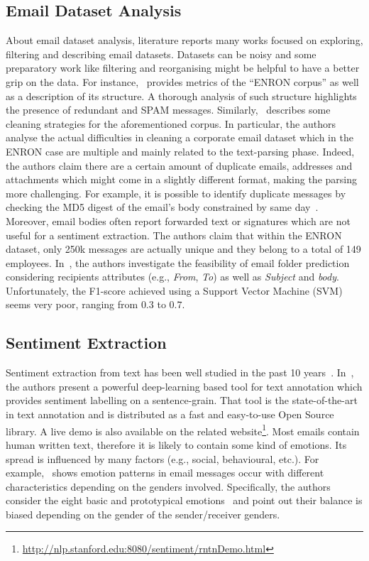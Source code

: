 \documentclass{vldb}
\begin{document}
\subsection{Email Dataset Analysis}
\label{sub-sec:email-dataset-analysis}
About email dataset analysis, literature reports many works focused on exploring, filtering and describing email datasets.
Datasets can be noisy and some preparatory work like filtering and reorganising might be helpful to have a better grip on the data.
For instance,~\cite{klimt2004introducing} provides metrics of the ``ENRON corpus'' as well as a description of its structure.
A thorough analysis of such structure highlights the presence of redundant and SPAM messages.
Similarly,~\cite{zhou2007strategies} describes some cleaning strategies for the aforementioned corpus.
In particular, the authors analyse the actual difficulties in cleaning a corporate email dataset which in the ENRON case are multiple and mainly related to the text-parsing phase.
Indeed, the authors claim there are a certain amount of duplicate emails, addresses and attachments which might come in a slightly different format, making the parsing more challenging.
For example, it is possible to identify duplicate messages by checking the MD5 digest of the email's body constrained by same day~\cite{corrada2004enron}.
Moreover, email bodies often report forwarded text or signatures which are not useful for a sentiment extraction.
The authors claim that within the ENRON dataset, only 250k messages are actually unique and they belong to a total of 149 employees.
In~\cite{klimt2004enron}, the authors investigate the feasibility of email folder prediction considering recipients attributes (e.g., \textit{From}, \textit{To}) as well as \textit{Subject} and \textit{body}.
Unfortunately, the F1-score achieved using a Support Vector Machine (SVM) seems very poor, ranging from $0.3$ to $0.7$. 


\subsection{Sentiment Extraction}
Sentiment extraction from text has been well studied in the past 10 years~\cite{aggarwal2012mining, das2007yahoo, bai2004sentiment, gamon2005pulse, bird2009natural}.
In~\cite{manning2014stanford}, the authors present a powerful deep-learning based tool for text annotation which provides sentiment labelling on a sentence-grain.
That tool is the state-of-the-art in text annotation and is distributed as a fast and easy-to-use Open Source library.
A live demo is also available on the related website\footnote{\url{http://nlp.stanford.edu:8080/sentiment/rntnDemo.html}}.
Most emails contain human written text, therefore it is likely to contain some kind of emotions.
Its spread is influenced by many factors (e.g., social, behavioural, etc.).
For example,~\cite{mohammad2011tracking} shows emotion patterns in email messages occur with different characteristics depending on the genders involved.
Specifically, the authors consider the eight basic and prototypical emotions~\cite{plutchik1980emotion} and point out their balance is biased depending on the gender of the sender/receiver genders.
\end{document}
